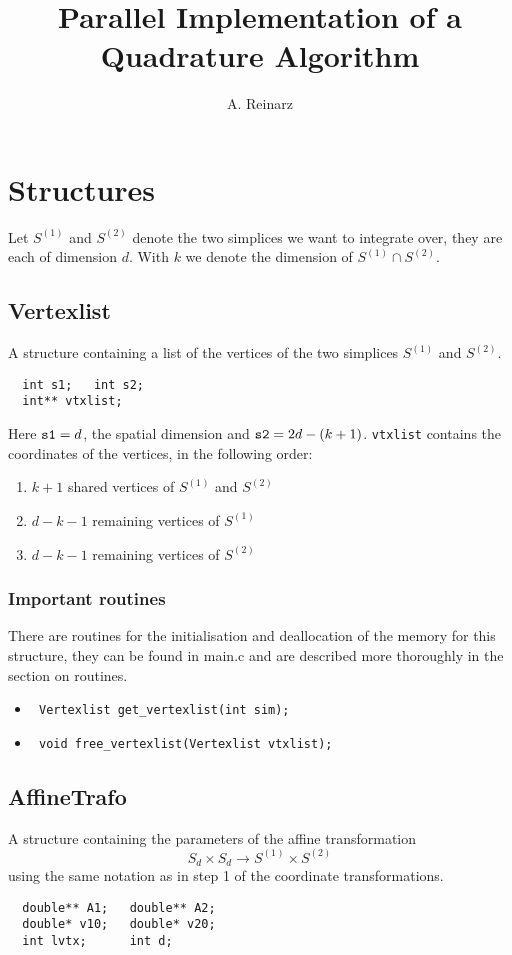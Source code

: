 \documentclass[a4paper,10pt]{article}
\title{Parallel Implementation of a Quadrature Algorithm}
\author{A. Reinarz}
\begin{document}

\maketitle
\tableofcontents
\newpage

\section{Structures}
Let $S^{(1)}$ and $S^{(2)}$ denote the two simplices we want to integrate over, they are each of dimension $d$.
With $k$ we denote the dimension of $S^{(1)}\cap S^{(2)}$. 
\subsection{Vertexlist}
A structure containing a list of the vertices of the two simplices $S^{(1)}$ and $S^{(2)}$.
\begin{verbatim}
  int s1;   int s2;
  int** vtxlist;
\end{verbatim}
Here $\verb=s1= = d$, the spatial dimension and $\verb=s2= = 2d-(k+1)$.
\verb=vtxlist= contains the coordinates of the vertices, in the following order:
\begin{enumerate}
\item $k+1$ shared vertices of $S^{(1)}$ and $S^{(2)}$
\item $d-k-1$ remaining vertices of $S^{(1)}$
\item $d-k-1$ remaining vertices of $S^{(2)}$
\end{enumerate}
\subsubsection*{Important routines}
There are routines for the initialisation and deallocation of the memory for this structure, they can be 
found in main.c and are described more thoroughly in the section on routines.
\begin{itemize}
\item \begin{verbatim} Vertexlist get_vertexlist(int sim);\end{verbatim}
\item \begin{verbatim} void free_vertexlist(Vertexlist vtxlist);\end{verbatim}
\end{itemize}

\subsection{AffineTrafo}
A structure containing the parameters of the affine transformation
 $$S_d \times S_d\rightarrow S^{(1)} \times S^{(2)}$$
using the same notation as in step 1 of the coordinate transformations.
\begin{verbatim}
  double** A1;   double** A2;
  double* v10;   double* v20;
  int lvtx;      int d;
\end{verbatim}
\end{document}
